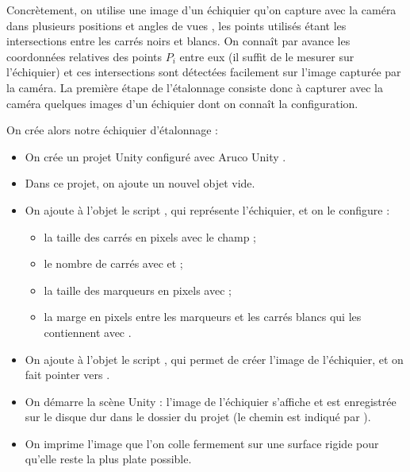 
Concrètement, on utilise une image d'un échiquier qu'on capture avec la caméra dans plusieurs positions et angles de vues , les points utilisés étant les intersections entre les carrés noirs et blancs. On connaît par avance les coordonnées relatives des points $P_i$ entre eux (il suffit de le mesurer sur l'échiquier) et ces intersections sont détectées facilement sur l'image capturée par la caméra. La première étape de l'étalonnage consiste donc à capturer avec la caméra quelques images d'un échiquier dont on connaît la configuration.


On crée alors notre échiquier d'étalonnage  :
\begin{itemize}
  \item On crée un projet Unity configuré avec Aruco Unity .
  \item Dans ce projet, on ajoute un nouvel objet vide.
  \item On ajoute à l'objet le script , qui représente l'échiquier, et on le configure :
  \begin{itemize}
    \item la taille des carrés en pixels avec le champ  ;
    \item le nombre de carrés avec  et  ;
    \item la taille des marqueurs en pixels avec  ;
    \item la marge en pixels entre les marqueurs et les carrés blancs qui les contiennent avec .
  \end{itemize}
  \item On ajoute à l'objet le script , qui permet de créer l'image de l'échiquier, et on fait pointer  vers .
  \item On démarre la scène Unity : l'image de l'échiquier s'affiche et est enregistrée sur le disque dur dans le dossier du projet (le chemin est indiqué par ).
  \item On imprime l'image que l'on colle fermement sur une surface rigide pour qu'elle reste la plus plate possible.
\end{itemize}
\medskip

